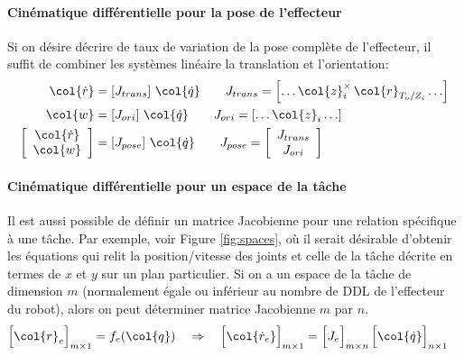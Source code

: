 \paragraph{Cinématique différentielle pour la pose de l'effecteur}

Si on désire décrire de taux de variation de la pose complète de l'effecteur, il suffit de combiner les systèmes linéaire la translation et l'orientation:
\begin{align}
\col{\dot{r}} &= \left[ J_{trans} \right]  \, \col{\dot{q}} \quad \quad 
J_{trans} = \left[ \hdots \col{z}_i^{\times} \, \col{r}_{T_o/Z_i}  \hdots  \right] \\
\col{w} &= \left[ J_{ori} \right]  \, \col{\dot{q}} \quad \quad 
J_{ori}   = \left[ \hdots   \col{z}_i  \hdots  \right] \\
\left[  \begin{array}{c}
\col{\dot{r}} \\ \col{w}
\end{array} \right] &= \left[ J_{pose} \right]  \, \col{\dot{q}} \quad \quad 
J_{pose}  = \left[ \begin{array}{c}
J_{trans} \\ J_{ori} 
\end{array} \right] 
\end{align}


\paragraph{Cinématique différentielle pour un espace de la tâche}

Il est aussi possible de définir un matrice Jacobienne pour une relation spécifique à une tâche. Par exemple, voir Figure \ref{fig:spaces}, où il serait désirable d'obtenir les équations qui relit la position/vitesse des joints et celle de la tâche décrite en termes de $x$ et $y$ sur un plan particulier. Si on a un espace de la tâche de dimension $m$ (normalement égale ou inférieur au nombre de DDL de l'effecteur du robot), alors on peut déterminer matrice Jacobienne $m$ par $n$. 
\begin{align}
\Big[ \col{r}_{e} \Big]_{m \times 1} = f_{e}( \col{q} )
\quad \Rightarrow \quad 
\Big[ \col{\dot{r}_{e}}\Big]_{m \times 1} &= \Big[ J_{e} \Big]_{m \times n}  \, \Big[ \col{\dot{q}} \Big]_{n \times 1}
\end{align}


